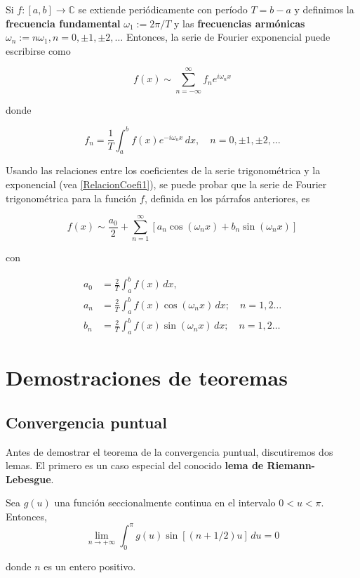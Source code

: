 Si $f:[a,b] \longrightarrow \mathbb{C}$ se extiende periódicamente con período $T = b-a$ y definimos la \textbf{frecuencia fundamental} $\omega_1 := 2\pi/T$ y las \textbf{frecuencias armónicas} $\omega_n := n \omega_1, n = 0, \pm 1, \pm 2,\dots$ Entonces, la serie de Fourier exponencial puede escribirse como 
\begin{shaded}
  $$f(x) \sim \sum_{n = - \infty}^{\infty} f_n e^{i \omega_n x}$$
\end{shaded}

donde 
\begin{shaded}
$$f_n = \frac{1}{T} \int_a^b f(x) e^{-i \omega_n x} \,dx, \quad n = 0, \pm 1, \pm 2, \dots$$    
\end{shaded}

Usando las relaciones entre los coeficientes de la serie trigonométrica y la exponencial (vea \eqref{RelacionCoefi1}), se puede probar que la serie de Fourier trigonométrica para la función $f$, definida en los párrafos anteriores, es
\begin{shaded}
$$f(x) \sim \frac{a_0}{2} + \sum_{n=1}^{\infty} \left[a_n \cos(\omega_n x) + b_n \sin(\omega_n x) \right]$$    
\end{shaded}

con
\begin{shaded}
 \begin{align*}
    a_0 &= \frac{2}{T} \int_a^b f(x) \,dx , \\
    a_n &= \frac{2}{T} \int_a^b f(x) \cos(\omega_n x) \,dx; \quad n = 1,2 \dots \\
    b_n &= \frac{2}{T} \int_a^b f(x) \sin(\omega_n x) \,dx; \quad n = 1,2 \dots
\end{align*}   
\end{shaded}

\section{Demostraciones de teoremas} \label{DemostracionesFourier}

\subsection*{Convergencia puntual}

Antes de demostrar el teorema de la convergencia puntual, discutiremos dos lemas. El primero es un caso especial del conocido \textbf{lema de Riemann-Lebesgue}.

\begin{lema} \label{lema1}
Sea $g(u)$ una función seccionalmente continua en el intervalo $0 <u < \pi$. Entonces, 
\begin{equation}
    \lim_{n \to + \infty} \int_0^{\pi} g(u) \sin [(n + 1/2)u] \,du = 0 \label{LemaFourier1}
\end{equation}

donde $n$ es un entero positivo.
\end{lema}

